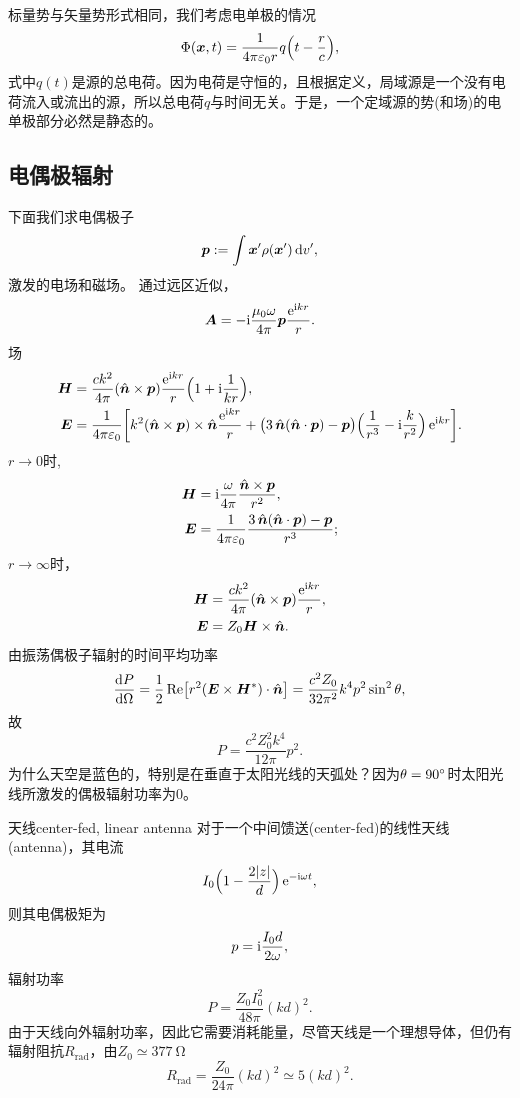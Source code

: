 标量势与矢量势形式相同，我们考虑电单极的情况
\[
    \Phi(\bm x,t)=\frac1{4\pi\varepsilon_0r}q\Bigl(t-\frac rc\Bigr),
\]
式中$q(t)$是源的总电荷。因为电荷是守恒的，且根据定义，局域源是一个没有电荷流入或流出的源，所以总电荷$q$与时间无关。于是，一个定域源的势(和场)的电单极部分必然是静态的。%

\subsection{电偶极辐射}
下面我们求电偶极子
\[
    \bm p:=\int\bm x'\rho(\bm x')\mathop{}\!\mathrm{d} v',
\]
激发的电场和磁场。
通过远区近似，
\[
    \bm A=-\mathrm{i}\frac{\mu_0\omega}{4\pi}\bm p\frac{\mathop{}\!\mathrm{e}^{\mathrm{i} kr}}r.
\]
场
\begin{align*}
    \bm H&=\frac{ck^2}{4\pi}(\uvec n\times\bm p)\frac{\e{\i kr}}r\Bigkh{1+\i\frac1{kr}},\\
    \bm E&=\frac1{4\pi\varepsilon_0}\biggfkh{k^2(\uvec n\times\bm p)\times\uvec n\frac{\e{\i kr}}r+\bigkh{3\uvec n(\uvec n\cdot\bm p)-\bm p}\Bigkh{\frac1{r^3}-\i\frac{k}{r^2}}\e{\i kr}}.
\end{align*}
$r\to 0$时,
\begin{align*}
    \bm H&=\mathrm{i}\frac{\omega}{4\pi}\frac{\mathop{}\!\hat{\bm n}\times\bm p}{r^2},\\
    \bm E&=\frac1{4\pi\varepsilon_0}\frac{3\mathop{}\!\hat{\bm n}(\mathop{}\!\hat{\bm n}\cdot\bm p)-\bm p}{r^3};
\end{align*}
$r\to\infty$时，
\begin{align*}
    \bm H&=\frac{ck^2}{4\pi}(\mathop{}\!\hat{\bm n}\times\bm p)\frac{\mathop{}\!\mathrm{e}^{\mathrm{i} kr}}r,\\
    \bm E&=Z_0\bm H\times\mathop{}\!\hat{\bm n}.
\end{align*}
由振荡偶极子辐射的时间平均功率
\[
    \frac{\mathrm{d}^{\;\!\!}P}{\mathrm{d} \Omega^{\;\!\!}}=\frac12\operatorname{Re}\bigl[r^2(\bm E\times\bm H^\ast)\cdot\mathop{}\!\hat{\bm n}\bigr]=\frac{c^2Z_0}{32\pi^2}k^4p^2\sin^2\theta,
\]
故
\begin{equation}
    P=\frac{c^2Z_0^2k^4}{12\pi}p^2.
\end{equation}
为什么天空是蓝色的，特别是在垂直于太阳光线的天弧处？因为$\theta=90^\circ$时太阳光线所激发的偶极辐射功率为0。
\begin{example}{天线}{center-fed, linear antenna}
    对于一个中间馈送(center-fed)的线性天线(antenna)，其电流
    \[
        I_0\Bigl(1-\frac{2|z|}d\Bigr)\mathop{}\!\mathrm{e}^{-\mathrm{i}\omega t},
    \]
    则其电偶极矩为
    \[
        p=\mathrm{i}\frac{I_0d}{2\omega},
    \]
    辐射功率
    \[
        P=\frac{Z_0I_0^2}{48\pi}(kd)^2.
    \]
    由于天线向外辐射功率，因此它需要消耗能量，尽管天线是一个理想导体，但仍有辐射阻抗$R_\text{rad}$，由$Z_0\simeq\SI{377}{\ohm}$
    \[
        R_\text{rad}=\frac{Z_0}{24\pi}(kd)^2\simeq 5(kd)^2.
    \]
\end{example}
